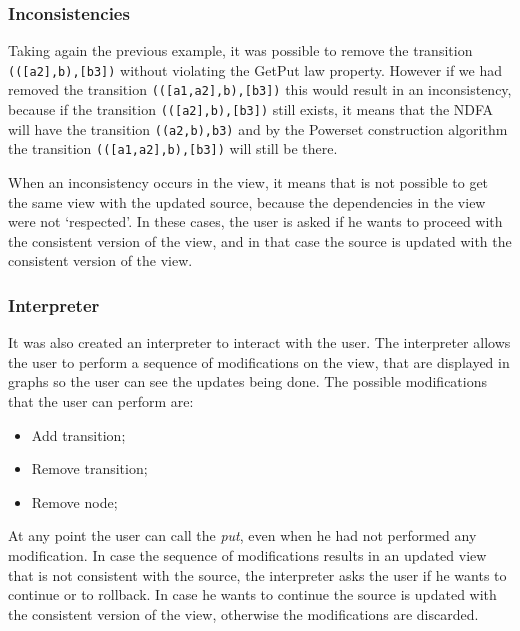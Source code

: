 \subsubsection{Inconsistencies}
Taking again the previous example, it was possible to remove the transition \texttt{(([a2],b),[b3])} without violating the GetPut law property. However if we had removed the transition \texttt{(([a1,a2],b),[b3])} this would result in an inconsistency, because if the transition \texttt{(([a2],b),[b3])} still exists, it means that the NDFA will have the transition \texttt{((a2,b),b3)} and by the Powerset construction algorithm the transition \texttt{(([a1,a2],b),[b3])} will still be there.

When an inconsistency occurs in the view, it means that is not possible to get the same view with the updated source, because the dependencies in the view were not `respected'. In these cases, the user is asked if he wants to proceed with the consistent version of the view, and in that case the source is updated with the consistent version of the view.


\subsubsection{Interpreter}
It was also created an interpreter to interact with the user. The interpreter allows the user to perform a sequence of modifications on the view, that are displayed in graphs so the user can see the updates being done.
The possible modifications that the user can perform are:

\begin{itemize}
    \item Add transition;
    \item Remove transition;
    \item Remove node;
\end{itemize}

At any point the user can call the  \textit{put}, even when he had not performed any modification. In case the sequence of modifications results in an updated view that is not consistent with the source, the interpreter asks the user if he wants to continue or to rollback. In case he wants to continue the source is updated with the consistent version of the view, otherwise the modifications are discarded.
